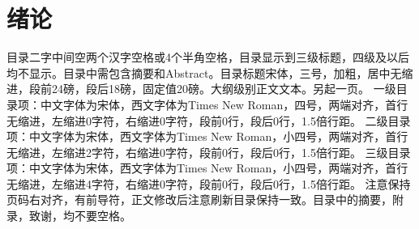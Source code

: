 \documentclass[GBK,UTF8,12pt,oneside,a4paper]{ctexbook}
\begin{document}
\pagestyle{fancy}
\renewcommand{\headrulewidth}{0pt}
\lhead{}           %
\rhead{}           %
\lfoot{}          %
\rfoot{}          %



\newpage

\renewcommand{\contentsname}{\centerline{\songti\zihao{3}\bfseries{目\quad\quad 录}}}
\renewcommand{\cftchapleader}{\cftdotfill{0.6}}
\renewcommand{\cftsecleader}{\cftdotfill{0.6}}
\renewcommand{\cftsubsecleader}{\cftdotfill{0.6}}
\renewcommand{\cftchapfont}{\songti\zihao{4}}
\renewcommand{\cftchappagefont}{\songti\zihao{4}}
\renewcommand{\cftsecfont}{\songti\zihao{-4}}
\renewcommand{\cftsecpagefont}{\songti\zihao{-4}}
\renewcommand{\cftsubsecfont}{\songti\zihao{-4}}
\renewcommand{\cftsubsecpagefont}{\songti\zihao{-4}}
\setlength{}
\setlength{}
\setlength{}
\setlength{\cftbeforetoctitleskip}{24pt}
\setlength{\cftaftertoctitleskip}{18pt}
\tableofcontents



\songti{}
\setlength{\baselineskip}{20pt}
\newpage
{}
\chapter{绪论}\label{chap:introduction}
目录二字中间空两个汉字空格或4个半角空格，目录显示到三级标题，四级及以后均不显示。目录中需包含摘要和Abstract。目录标题宋体，三号，加粗，居中无缩进，段前24磅，段后18磅，固定值20磅。大纲级别正文文本。另起一页。
一级目录项：中文字体为宋体，西文字体为Times New Roman，四号，两端对齐，首行无缩进，左缩进0字符，右缩进0字符，段前0行，段后0行，1.5倍行距。
二级目录项：中文字体为宋体，西文字体为Times New Roman，小四号，两端对齐，首行无缩进，左缩进2字符，右缩进0字符，段前0行，段后0行，1.5倍行距。
三级目录项：中文字体为宋体，西文字体为Times New Roman，小四号，两端对齐，首行无缩进，左缩进4字符，右缩进0字符，段前0行，段后0行，1.5倍行距。
注意保持页码右对齐，有前导符，正文修改后注意刷新目录保持一致。目录中的摘要，附录，致谢，均不要空格。
\end{document}
